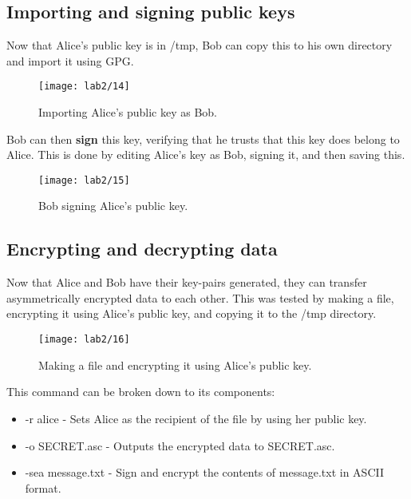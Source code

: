 \subsection{Importing and signing public keys}\label{subsec:importing-public-keys}
Now that Alice's public key is in /tmp, Bob can copy this to his own directory and import it using GPG\@.

\begin{figure}[H]
    \centering
    \texttt{[image: lab2/14]}
    \caption{Importing Alice's public key as Bob.}
    \label{fig:importAlice}
\end{figure}

\pagebreak

\noindent Bob can then \textbf{sign} this key, verifying that he trusts that this key does belong to Alice.
This is done by editing Alice's key as Bob, signing it, and then saving this.

\begin{figure}[H]
    \centering
    \texttt{[image: lab2/15]}
    \caption{Bob signing Alice's public key.}
    \label{fig:signAliceKey}
\end{figure}

\pagebreak

\subsection{Encrypting and decrypting data}\label{subsec:encrDecr}
Now that Alice and Bob have their key-pairs generated, they can transfer asymmetrically encrypted data to each other.
This was tested by making a file, encrypting it using Alice's public key, and copying it to the /tmp directory.

\begin{figure}[H]
    \centering
    \texttt{[image: lab2/16]}
    \caption{Making a file and encrypting it using Alice's public key.}
    \label{fig:encLab2Msg}
\end{figure}

This command can be broken down to its components:
\begin{itemize}
    \item -r alice - Sets Alice as the recipient of the file by using her public key.
    \item -o SECRET.asc - Outputs the encrypted data to SECRET.asc.
    \item -sea message.txt - Sign and encrypt the contents of message.txt in ASCII format.
\end{itemize}

